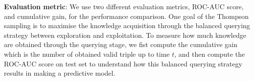 \textbf{Evaluation metric}: We use two different evaluation metrics, ROC-AUC score, and cumulative gain,
for the performance comparison. One goal of the Thompson sampling is to maximise the knowledge 
acquisition through the balanced querying strategy between exploration and exploitation. 
To measure how much knowledge are obtained through the querying stage, we fist compute the cumulative 
gain which is the number of obtained valid triple up to time $t$, and then compute the ROC-AUC score on 
test set to understand how this balanced querying strategy results in making a predictive model.

%	


